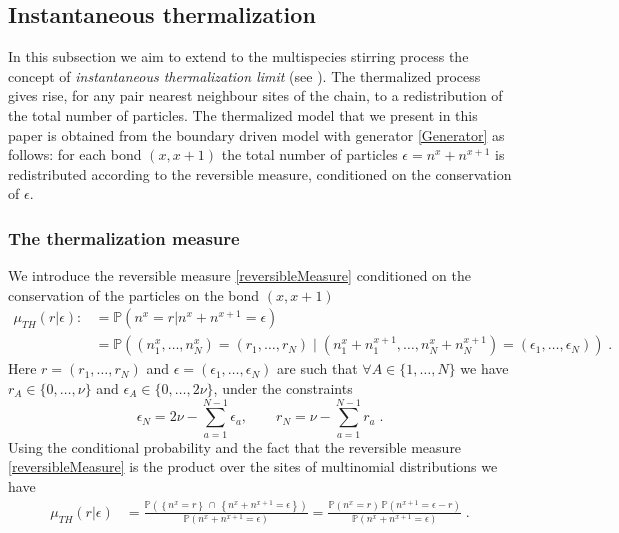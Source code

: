 \documentclass[10pt]{article}
\numberwithin{equation}{section}
\numberwithin{equation}{subsection}
\newcommand{\dt}{\;.}
\begin{document}
\subsection{Instantaneous thermalization}\label{Subsection-Thermalized}
In this subsection we aim to extend to the multispecies stirring process the concept of \textit{instantaneous thermalization limit} (see \cite{carinci2013duality,KMP}). The thermalized process gives rise, for any pair nearest neighbour sites of the chain, to a redistribution of the total number of particles. The thermalized model that we present in this paper is obtained from the boundary driven model with generator \eqref{Generator} as follows: for each bond $(x,x+1)$ the total number of particles $\epsilon=n^{x}+n^{x+1}$ is redistributed according to the reversible measure, conditioned on the conservation of $\epsilon$. 
\subsubsection{The thermalization measure}
We introduce the reversible measure \eqref{reversibleMeasure} conditioned on the conservation of the particles on the bond $(x,x+1)$
\begin{align}
	\mu_{TH}(r|\epsilon):&=\mathbb{P}\left(n^{x}=r|n^{x}+n^{x+1}=\epsilon\right)\nonumber
	\\&
	=\mathbb{P}\left((n_{1}^{x},\ldots,n_{N}^{x})=
	(r_{1},\ldots,r_{N})\;|\;(n_{1}^{x}+n_{1}^{x+1},\ldots,n_{N}^{x}+n_{N}^{x+1})=(\epsilon_{1},\ldots,\epsilon_{N})\right)\dt
\end{align}
Here $r=(r_{1},\ldots,r_{N})$ and  $\epsilon=(\epsilon_{1},\ldots,\epsilon_{N})$ are such that $\forall A\in\{1,\ldots,N\}$ we have $r_{A}\in \{0,\ldots,\nu\}$ and $\epsilon_{A}\in \{0,\ldots,2\nu\}$, under the constraints 
\begin{equation}
	\epsilon_{N}=2\nu-\sum_{a=1}^{N-1}\epsilon_{a},\qquad r_{N}=\nu-\sum_{a=1}^{N-1}r_{a}\dt
\end{equation}
 Using the conditional probability and the fact that the reversible measure \eqref{reversibleMeasure} is the product over the sites of multinomial distributions we have
\begin{equation}
	\begin{split}
\mu_{TH}(r|\epsilon)&=\frac{\mathbb{P}\left(\left\{n^{x}=r\right\}\,\cap\,\left\{n^{x}+n^{x+1}=\epsilon\right\}\right)}{\mathbb{P}\left(n^{x}+n^{x+1}=\epsilon\right)}=\frac{\mathbb{P}\left(n^{x}=r\right)\,\mathbb{P}\left(n^{x+1}=\epsilon-r\right)}{\mathbb{P}\left(n^{x}+n^{x+1}=\epsilon\right)}\dt
	\end{split}
\end{equation}
\end{document}
